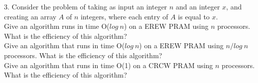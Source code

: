 \documentclass[10pt]{article}
\begin{document}
3. Consider the problem of taking as input an integer $n$ and an integer $x$, and creating an array $A$ of $n$
integers, where each entry of $A$ is equal to $x$.\\

Give an algorithm runs in time O($log~n$) on a EREW PRAM using $n$ processors. What is the
efficiency of this algorithm?\\

Give an algorithm that runs in time O($log~n$) on a EREW PRAM using $n/log~n$ processors. What
is the efficiency of this algorithm?\\

Give an algorithm that runs in time O(1) on a CRCW PRAM using $n$ processors. What is the
efficiency of this algorithm?
\end{document}
